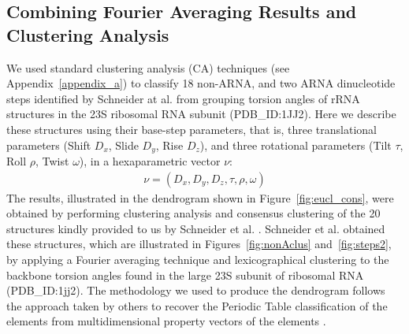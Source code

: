 \subsection{Combining Fourier Averaging Results and Clustering Analysis}
We   used   standard   clustering   analysis  (CA)   techniques   (see
Appendix~\ref{appendix_a})  to  classify  18  non-ARNA, and  two  ARNA
dinucleotide steps identified  by Schneider at al.\cite{schneider2004}
from  grouping torsion angles  of rRNA  structures in  the 23S
ribosomal  RNA   subunit  (PDB\_ID:1JJ2).   Here   we  describe  these
structures   using  their   base-step  parameters,   that   is,  three
translational parameters  (Shift $D_x$, Slide $D_y$,  Rise $D_z$), and
three   rotational  parameters  (Tilt   $\tau$,  Roll   $\rho$,  Twist
$\omega$), in a hexaparametric vector $\nu$:
\begin{gather}
\nu = (D_x, D_y, D_z, \tau, \rho, \omega)
\end{gather}
The    results,    illustrated   in    the    dendrogram   shown    in
Figure~\ref{fig:eucl_cons},  were  obtained  by performing  clustering
analysis and consensus clustering of the 20 structures kindly provided
to  us by Schneider  et al.   \cite{schneider2004}.  Schneider  et al.
obtained    these    structures,     which    are    illustrated    in
Figures~\ref{fig:nonAclus} and~\ref{fig:steps2}, by applying a Fourier
averaging  technique and  lexicographical clustering  to  the backbone
torsion  angles  found in  the  large  23S  subunit of  ribosomal  RNA
(PDB\_ID:1jj2).   The methodology  we used  to produce  the dendrogram
follows the  approach taken  by others to  recover the  Periodic Table
classification of the  elements from multidimensional property vectors
of the elements \cite{restrepo2004, restrepo2006}.
